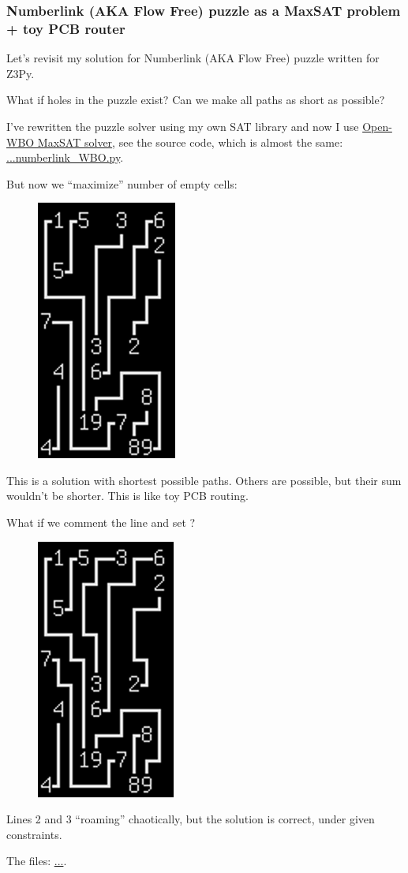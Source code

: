 \subsubsection{Numberlink (AKA Flow Free) puzzle as a MaxSAT problem + toy PCB router}

Let's revisit my solution for Numberlink (AKA Flow Free) puzzle written for Z3Py.

What if holes in the puzzle exist?
Can we make all paths as short as possible?

I've rewritten the puzzle solver using my own SAT library 
and now I use \href{http://sat.inesc-id.pt/open-wbo/}{Open-WBO MaxSAT solver},
see the source code, which is almost the same: \url{...numberlink_WBO.py}.

But now we ``maximize'' number of empty cells:


\begin{figure}[H]
\centering
\includegraphics[scale=0.5]{puzzles/numberlink/MaxSAT/MaxSAT.png}
\caption{}
\end{figure}

This is a solution with shortest possible paths. Others are possible, but their sum wouldn't be shorter.
This is like toy PCB routing.

What if we comment the  line and set ?

\begin{figure}[H]
\centering
\includegraphics[scale=0.5]{puzzles/numberlink/MaxSAT/SAT.png}
\caption{}
\end{figure}

Lines 2 and 3 ``roaming'' chaotically, but the solution is correct, under given constraints.

The files: \url{...}.


